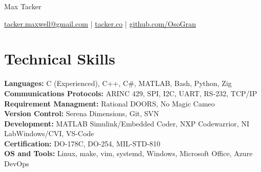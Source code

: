\documentclass[11pt]{article}       %
\begin{document}
\centerline{\Huge Max Tacker}

\vspace{5pt}

\centerline{\href{mailto:tacker.maxwell@gmail.com}{tacker.maxwell@gmail.com} | \href{https://www.tacker.co/}{tacker.co} | \href{https://www.github.com/OsoGran}{github.com/OsoGran}}

\vspace{-10pt}

\section*{Technical Skills}
\textbf{Languages:} C (Experienced), C++, C\#, MATLAB, Bash, Python, Zig\\
\textbf{Communications Protocols:} ARINC 429, SPI, I2C, UART, RS-232, TCP/IP\\
\textbf{Requirement Managment:} Rational DOORS, No Magic Cameo\\
\textbf{Version Control:} Serena Dimensions, Git, SVN\\
\textbf{Development:} MATLAB Simulink/Embedded Coder, NXP Codewarrior, NI LabWindows/CVI, VS-Code\\
\textbf{Certification:} DO-178C, DO-254, MIL-STD-810\\
\textbf{OS and Tools:} Linux, make, vim, systemd, Windows, Microsoft Office, Azure DevOps\\

\vspace{-6.5pt}

\end{document}
